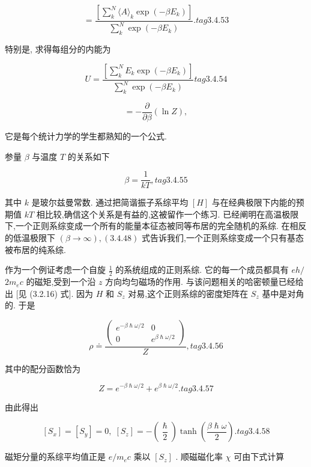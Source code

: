 $$
= \frac{\left\lbrack \mathop{\sum }\limits_{k}^{N}\langle A{\rangle }_{k}\exp \left( -\beta {E}_{k}\right) \right\rbrack }{\mathop{\sum }\limits_{k}^{N}\exp \left( {-\beta {E}_{k}}\right) }. tag{3. 4.53}
$$

特别是, 求得每组分的内能为

$$
U = \frac{\left\lbrack \mathop{\sum }\limits_{k}^{N}{E}_{k}\exp \left( -\beta {E}_{k}\right) \right\rbrack }{\mathop{\sum }\limits_{k}^{N}\exp \left( {-\beta {E}_{k}}\right) } tag{3. 4.54}
$$

$$
= - \frac{\partial }{\partial \beta }\left( {\ln Z}\right) ,
$$

它是每个统计力学的学生都熟知的一个公式.

参量 $\beta$ 与温度 $T$ 的关系如下

$$
\beta = \frac{1}{kT}, tag{3. 4. 55}
$$

其中 $k$ 是玻尔兹曼常数. 通过把简谐振子系综平均 $\left\lbrack H\right\rbrack$ 与在经典极限下内能的预期值 ${kT}$ 相比较,确信这个关系是有益的,这被留作一个练习. 已经阐明在高温极限下,一个正则系综变成一个所有的能量本征态被同等布居的完全随机的系综. 在相反的低温极限下 $\left( {\beta \rightarrow \infty }\right) ,\left( {3.4.48}\right)$ 式告诉我们,一个正则系综变成一个只有基态被布居的纯系综.

作为一个例证考虑一个自旋 $\frac{1}{2}$ 的系统组成的正则系综. 它的每一个成员都具有 ${eh}/$ $2{m}_{e}c$ 的磁矩,受到一个沿 $z$ 方向均匀磁场的作用. 与该问题相关的哈密顿量已经给出 [见 (3.2.16) 式]. 因为 $H$ 和 ${S}_{z}$ 对易,这个正则系综的密度矩阵在 ${S}_{z}$ 基中是对角的. 于是

$$
\rho \doteq \frac{\left( \begin{matrix} {e}^{-\beta \hslash \omega /2} & 0 \\ 0 & {e}^{\beta \hslash \omega /2} \end{matrix}\right) }{Z}, tag{3. 4.56}
$$

其中的配分函数恰为

$$
Z = {e}^{-\beta \hslash \omega /2} + {e}^{\beta \hslash \omega /2}. tag{3. 4.57}
$$

由此得出

$$
\left\lbrack {S}_{x}\right\rbrack = \left\lbrack {S}_{y}\right\rbrack = 0,\;\left\lbrack {S}_{z}\right\rbrack = - \left( \frac{\hslash }{2}\right) \tanh \left( \frac{\beta \hslash \omega }{2}\right) . tag{3. 4.58}
$$

磁矩分量的系综平均值正是 $e/{m}_{e}c$ 乘以 $\left\lbrack {S}_{z}\right\rbrack$ . 顺磁磁化率 $\chi$ 可由下式计算

